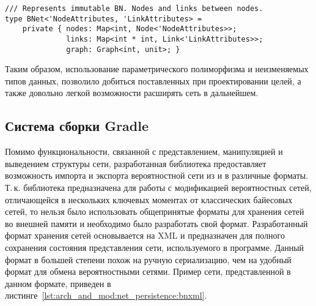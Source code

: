 \begin{lstlisting}[style=fsharpstyle,caption={Определение структуры данных для вероятностной сети}, label=lst:arch_and_mod:probab_net:bnet_definition]
/// Represents immutable BN. Nodes and links between nodes.
type BNet<'NodeAttributes, 'LinkAttributes> = 
    private { nodes: Map<int, Node<'NodeAttributes>>;
              links: Map<int * int, Link<'LinkAttributes>>;
              graph: Graph<int, unit>; } 
\end{lstlisting}

Таким образом, использование параметрического полиморфизма и не\-изменяемых типов данных, позволило добиться поставленных при проектировании целей, а также довольно легкой возможности расширять сеть в дальнейшем.

\subsection{Система сборки Gradle} %
\label{sub:arch:gradle}

Помимо функциональности, связанной с представлением, манипуляцией и выведением структуры сети, разработанная библиотека предоставляет возможность импорта и экспорта вероятностной сети из и в различные форматы.
Т.\,к. библиотека предназначена для работы с модификацией вероятностных сетей, отличающейся в нескольких ключевых моментах от классических байесовых сетей, то нельзя было использовать общепринятые форматы для хранения сетей во внешней памяти и необходимо было разработать свой формат.
Разработанный формат хранения сетей основывается на XML и предназначен для полного сохранения состояния представления сети, используемого в программе.
Данный формат в большей степени похож на ручную сериализацию, чем на удобный формат для обмена вероятностными сетями.
Пример сети, представленной в данном формате, приведен в листинге~\ref{lst:arch_and_mod:net_persistence:bnxml}.

